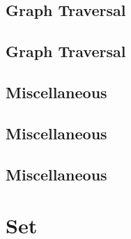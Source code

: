 \vspace{-.7\baselineskip}\hrulefill
\vspace{0.1\baselineskip}\subsection{Graph Traversal}
\raggedbottom
\vspace{-.7\baselineskip}\hrulefill
\vspace{0.1\baselineskip}\subsection{Graph Traversal}
\raggedbottom
\vspace{-.7\baselineskip}\hrulefill
\vspace{0.1\baselineskip}\subsection{Miscellaneous}
\raggedbottom
\vspace{-.7\baselineskip}\hrulefill
\vspace{0.1\baselineskip}\subsection{Miscellaneous}
\raggedbottom
\vspace{-.7\baselineskip}\hrulefill
\vspace{0.1\baselineskip}\subsection{Miscellaneous}
\raggedbottom
\vspace{-.7\baselineskip}\hrulefill
\vspace{0.1\baselineskip}
\section{Set}
